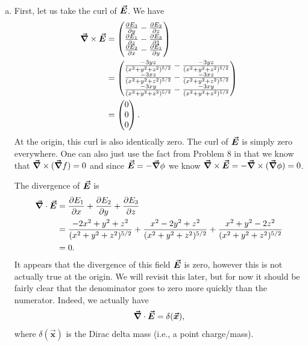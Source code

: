 \documentclass[12pt]{article} %
\newcommand{\vecx}{\boldsymbol{\vec{x}}}
\begin{document}
\begin{solution}~
\begin{enumerate}[(a)]
   	\item First, let us take the curl of $\boldsymbol{\vec{E}}$.  We have
    \begin{align*}
        \boldsymbol{\vec{\nabla}} \times \boldsymbol{\vec{E}} &= \begin{pmatrix} \frac{\partial E_3}{\partial y} - \frac{\partial E_2}{\partial z} \\ \frac{\partial E_1}{\partial z} -\frac{\partial E_3}{\partial 1} \\ \frac{\partial E_2}{\partial x} - \frac{\partial E_1}{\partial y} \end{pmatrix}\\
        &= \begin{pmatrix} \frac{-3yz}{(x^2+y^2+z^2)^{5/2}} - \frac{-3yz}{(x^2+y^2+z^2)^{5/2}} \\ \frac{-3xz}{(x^2+y^2+z^2)^{5/2}} - \frac{-3xz}{(x^2+y^2+z^2)^{5/2}} \\
        \frac{-3xy}{(x^2+y^2+z^2)^{5/2}} -\frac{-3xy}{(x^2+y^2+z^2)^{5/2}} \end{pmatrix}\\
        &= \begin{pmatrix} 0 \\ 0 \\ 0 \end{pmatrix}.
    \end{align*}
    At the origin, this curl is also identically zero.  The curl of $\boldsymbol{\vec{E}}$ is simply zero everywhere. One can also just use the fact from Problem 8 in that we know that $\boldsymbol{\vec{\nabla}} \times (\boldsymbol{\vec{\nabla}} f) = 0$ and since $\boldsymbol{\vec{E}} = -\boldsymbol{\vec{\nabla}} \phi$ we know $\boldsymbol{\vec{\nabla}} \times \boldsymbol{\vec{E}} = -\boldsymbol{\vec{\nabla}} \times (\boldsymbol{\vec{\nabla}} \phi) = 0$.

    The divergence of $\boldsymbol{\vec{E}}$ is
    \begin{align*}
        \boldsymbol{\vec{\nabla}} \cdot \boldsymbol{\vec{E}} &= \frac{\partial E_1}{\partial x} + \frac{\partial E_2}{\partial y} + \frac{\partial E_3}{\partial z}\\
        &= \frac{-2x^2+y^2+z^2}{(x^2+y^2+z^2)^{5/2}} + \frac{x^2-2y^2+z^2}{(x^2+y^2+z^2)^{5/2}} + \frac{x^2+y^2-2z^2}{(x^2+y^2+z^2)^{5/2}}\\
        &= 0.
    \end{align*}
    It appears that the divergence of this field $\boldsymbol{\vec{E}}$ is zero, however this is not actually true at the origin. We will revisit this later, but for now it should be fairly clear that the denominator goes to zero more quickly than the numerator. Indeed, we actually have
    \[
        \grad \cdot \vecfieldE = \delta(\vecx),
    \]
    where $\delta(\vecx)$ is the Dirac delta mass (i.e., a point charge/mass).



\end{enumerate}
\end{solution}
\end{document}
